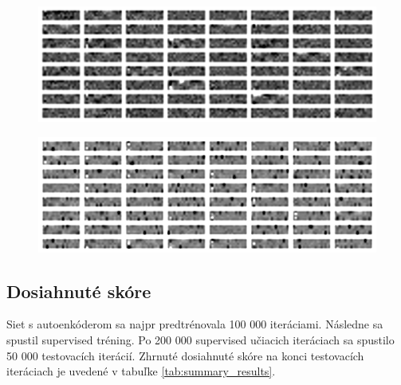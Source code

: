 \documentclass[10pt,a4paper]{article}
\begin{document}
\begin{figure}[!htb]
\centering
\begin{minipage}{.5\textwidth}
  \centering
  \includegraphics[scale=0.4]{../../diagrams/layer_1_fnn_sparse.png}
  \label{img:FNN sparse weights visualisation}
\end{minipage}%
\begin{minipage}{.5\textwidth}
  \centering
  \includegraphics[scale=0.4]{../../diagrams/layer_1_hnn_sparse.png}
  \label{img:AE+FNN sparse weights visualisation}
\end{minipage}
\end{figure}



\subsection{Dosiahnuté skóre}
Siet s autoenkóderom sa najpr predtrénovala 100 000 iteráciami. Následne sa spustil
supervised tréning. Po 200 000 supervised učiacich iteráciach sa spustilo 50 000 testovacích iterácií.
Zhrnuté dosiahnuté skóre na konci testovacích iteráciach je uvedené v tabuľke \ref{tab:summary_results}.
\end{document}
